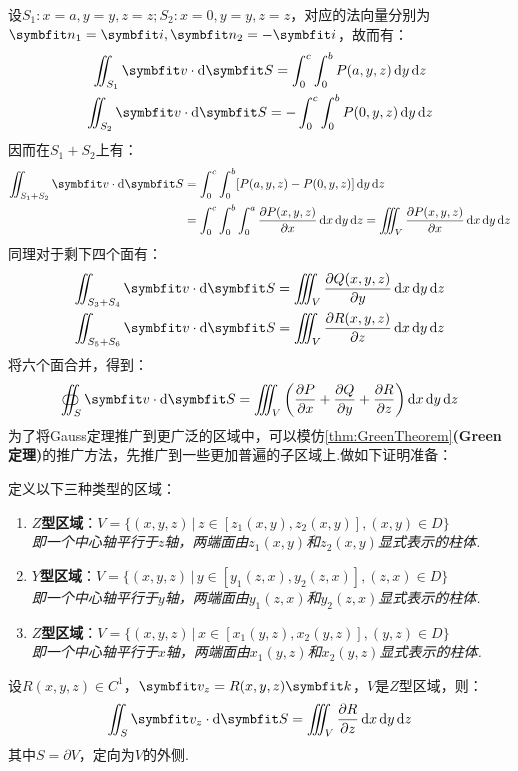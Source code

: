 设$S_1:x=a,y=y,z=z;S_2:x=0,y=y,z=z$，对应的法向量分别为$\vb{n}_1 = \vb{i},\vb{n}_2=-\vb{i}$，故而有：
\begin{gather*}
    \iint_{S_1}\vb{v}\cdot\dd{\vb{S}} = \int_{0}^{c}\int_{0}^{b}P(a,y,z)\dd{y}\dd{z} \\
    \iint_{S_2}\vb{v}\cdot\dd{\vb{S}} = -\int_{0}^{c}\int_{0}^{b}P(0,y,z)\dd{y}\dd{z}
\end{gather*}
因而在$S_1+S_2$上有：
\begin{align*}
    \iint_{S_1+S_2}\vb{v}\cdot\dd{\vb{S}} &= \int_{0}^{c}\int_{0}^{b}[P(a,y,z)-P(0,y,z)]\dd{y}\dd{z} \\
    &= \int_{0}^{c}\int_{0}^{b}\int_{0}^{a}\pdv{P(x,y,z)}{x}\dd{x}\dd{y}\dd{z} = \iiint_V\pdv{P(x,y,z)}{x}\dd{x}\dd{y}\dd{z}
\end{align*}
同理对于剩下四个面有：
\begin{gather*}
    \iint_{S_3+S_4}\vb{v}\cdot\dd{\vb{S}} = \iiint_V\pdv{Q(x,y,z)}{y}\dd{x}\dd{y}\dd{z} \\
    \iint_{S_5+S_6}\vb{v}\cdot\dd{\vb{S}} = \iiint_V\pdv{R(x,y,z)}{z}\dd{x}\dd{y}\dd{z}
\end{gather*}
将六个面合并，得到：
\[\oiint_S \vb{v}\cdot\dd{\vb{S}} = \iiint_V\left(\pdv{P}{x}+\pdv{Q}{y}+\pdv{R}{z}\right)\dd{x}\dd{y}\dd{z}\]
为了将Gauss定理推广到更广泛的区域中，可以模仿\cref{thm:GreenTheorem}\textbf{(Green定理)}的推广方法，先推广到一些更加普遍的子区域上.做如下证明准备：

定义以下三种类型的区域：
\begin{enumerate}[circ]
    \item \textbf{$Z$型区域}：$V = \{(x,y,z)\,|\,z\in[z_1(x,y),z_2(x,y)],(x,y)\in D\}$\\
    \textit{即一个中心轴平行于$z$轴，两端面由$z_1(x,y)$和$z_2(x,y)$显式表示的柱体.}
    \item \textbf{$Y$型区域}：$V = \{(x,y,z)\,|\,y\in[y_1(z,x),y_2(z,x)],(z,x)\in D\}$\\
    \textit{即一个中心轴平行于$y$轴，两端面由$y_1(z,x)$和$y_2(z,x)$显式表示的柱体.}
    \item \textbf{$Z$型区域}：$V = \{(x,y,z)\,|\,x\in[x_1(y,z),x_2(y,z)],(y,z)\in D\}$\\
    \textit{即一个中心轴平行于$x$轴，两端面由$x_1(y,z)$和$x_2(y,z)$显式表示的柱体.}
\end{enumerate}

\begin{theorem}
    设$R(x,y,z)\in C^1$，$\vb{v}_z = R(x,y,z)\vb{k}$，$V$是$Z$型区域，则：
    \[\iint_S \vb{v}_z\cdot\dd{\vb{S}} = \iiint_V\pdv{R}{z}\dd{x}\dd{y}\dd{z}\]
    其中$S = \partial V$，定向为$V$的外侧.
\end{theorem}

